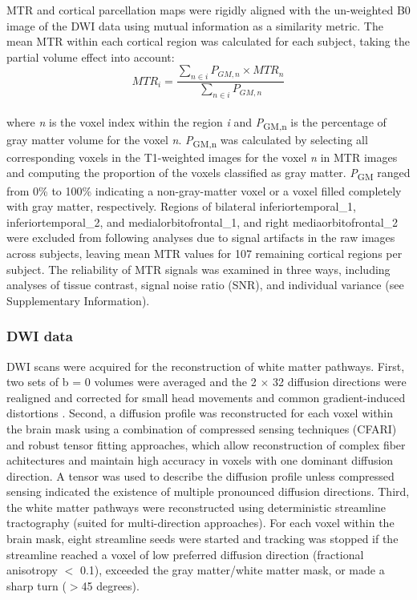 \begin{refsection}
MTR and cortical parcellation maps were rigidly aligned with the un-weighted B0 image of the DWI data using mutual information as a similarity metric. The mean MTR within each cortical region was calculated for each subject, taking the partial volume effect into account:\\
\[MTR_{i} = \frac{\sum_{n\in i} P_{GM,n} \times MTR_{n}}{\sum_{n\in i} P_{GM,n}} \]\\
where \textit{n} is the voxel index within the region \textit{i} and \textit{P}\textsubscript{GM,n} is the percentage of gray matter volume for the voxel \textit{n}. \textit{P}\textsubscript{GM,n} was calculated by selecting all corresponding voxels in the T1-weighted images for the voxel \textit{n} in MTR images and computing the proportion of the voxels classified as gray matter. \textit{P}\textsubscript{GM} ranged from 0\% to 100\% indicating a non-gray-matter voxel or a voxel filled completely with gray matter, respectively. Regions of bilateral inferiortemporal\_1, inferiortemporal\_2, and medialorbitofrontal\_1, and right mediaorbitofrontal\_2 were excluded from following analyses due to signal artifacts in the raw images across subjects, leaving mean MTR values for 107 remaining cortical regions per subject. The reliability of MTR signals was examined in three ways, including analyses of tissue contrast, signal noise ratio (SNR), and individual variance (see Supplementary Information).

\subsubsection*{DWI data}
DWI scans were acquired for the reconstruction of white matter pathways. First, two sets of b = 0 volumes were averaged and the 2 $\times$ 32 diffusion directions were realigned and corrected for small head movements and common gradient-induced distortions \citep{ANDERSSON2002177}. Second, a diffusion profile was reconstructed for each voxel within the brain mask using a combination of compressed sensing techniques (CFARI) \citep{Landman2012ResolutionOC} and robust tensor fitting approaches, which allow reconstruction of complex fiber achitectures and maintain high accuracy in voxels with one dominant diffusion direction. A tensor was used to describe the diffusion profile unless compressed sensing indicated the existence of multiple pronounced diffusion directions. Third, the white matter pathways were reconstructed using deterministic streamline tractography (suited for multi-direction approaches). For each voxel within the brain mask, eight streamline seeds were started and tracking was stopped if the streamline reached a voxel of low preferred diffusion direction (fractional anisotropy $<$ 0.1), exceeded the gray matter/white matter mask, or made a sharp turn ($>$45 degrees).


\end{refsection}
